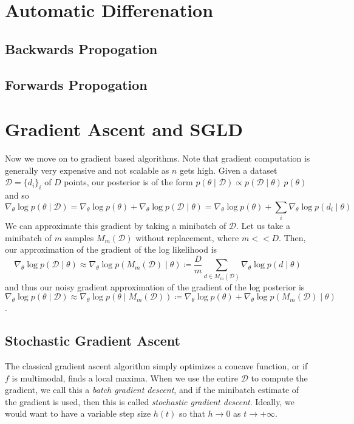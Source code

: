 \documentclass{article}
\theoremstyle{remark}
\theoremstyle{definition}
\begin{document}
\pagebreak

\section{Automatic Differenation}

\subsection{Backwards Propogation}

\subsection{Forwards Propogation}

\section{Gradient Ascent and SGLD}
Now we move on to gradient based algorithms. Note that gradient computation is generally very expensive and not scalable as $n$ gets high. Given a dataset $\mathcal{D} = \{d_i\}_i$ of $D$ points, our posterior is of the form $p(\theta \mid \mathcal{D}) \propto p(\mathcal{D} \mid \theta) \, p(\theta)$ and so 
\[\nabla_\theta \log p(\theta \mid \mathcal{D}) = \nabla_\theta \log{p(\theta)} + \nabla_\theta \log{p(\mathcal{D} \mid \theta)} = \nabla_\theta \log{p(\theta)} + \sum_i \nabla_\theta \log{p(d_i \mid \theta)}\]
We can approximate this gradient by taking a minibatch of $\mathcal{D}$. Let us take a minibatch of $m$ samples $M_m (\mathcal{D})$ without replacement, where $m << D$. Then, our approximation of the gradient of the log likelihood is 
\[\nabla_\theta \log{p(\mathcal{D} \mid \theta)} \approx \nabla_\theta \log{p (M_m (\mathcal{D}) \mid \theta)} \coloneqq \frac{D}{m} \sum_{d \in M_m(\mathcal{D})} \nabla_\theta \log{p(d \mid \theta)}\]
and thus our noisy gradient approximation of the gradient of the log posterior is $\nabla_\theta \log{p(\theta \mid \mathcal{D})} \approx \nabla_\theta \log{p(\theta \mid M_m(\mathcal{D}))} \coloneqq \nabla_\theta \log{p(\theta)} + \nabla_\theta \log{p (M_m (\mathcal{D}) \mid \theta)}$. 

\subsection{Stochastic Gradient Ascent}
The classical gradient ascent algorithm simply optimizes a concave function, or if $f$ is multimodal, finds a local maxima. When we use the entire $\mathcal{D}$ to compute the gradient, we call this a \textit{batch gradient descent}, and if the minibatch estimate of the gradient is used, then this is called \textit{stochastic gradient descent}. Ideally, we would want to have a variable step size $h(t)$ so that $h \rightarrow 0$ as $t \rightarrow + \infty$. 
\end{document}
